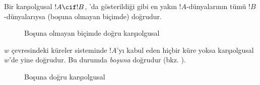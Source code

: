 \documentclass[../../../include/open-logic-section]{subfiles}
\begin{document}


Bir karşıolgusal $!A\cif !B$, 'da gösterildiği gibi en
yakın $!A$-dünyalarının tümü $!B$-dünyalarıysa (boşuna olmayan biçimde)
doğrudur.
\begin{figure}
\begin{center}
\caption{Boşuna olmayan biçimde doğru karşıolgusal}
\end{center}
\end{figure}
$w$ çevresindeki küreler sisteminde $!A$'yı kabul eden hiçbir küre yoksa
karşıolgusal $w$'de yine doğrudur. Bu durumda \emph{boşuna} doğrudur
(bkz. ).
\begin{figure}
\begin{center}
\caption{Boşuna doğru karşıolgusal}
\end{center}
\end{figure}
\end{document}
